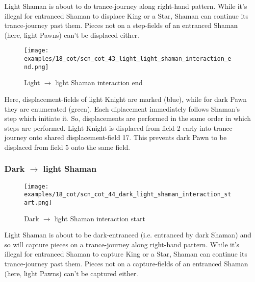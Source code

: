 Light Shaman is about to do trance-journey along right-hand pattern. While it's
illegal for entranced Shaman to displace King or a Star, Shaman can continue its
trance-journey past them. Pieces not on a step-fields of an entranced Shaman (here,
light Pawns) can't be displaced either.

\clearpage %

\noindent
\begin{figure}[!h]
\texttt{[image: examples/18\_cot/scn\_cot\_43\_light\_light\_shaman\_interaction\_end.png]}
\caption{Light $\rightarrow$ light Shaman interaction end}
\label{fig:scn_cot_43_light_light_shaman_interaction_end}
\end{figure}

Here, displacement-fields of light Knight are marked (blue), while for dark Pawn
they are enumerated (green). Each diplacement immediately follows Shaman's step
which initiate it. So, displacements are performed in the same order in which steps
are performed. Light Knight is displaced from field 2 early into trance-journey
onto shared displacement-field 17. This prevents dark Pawn to be displaced from
field 5 onto the same field.

\clearpage %

\subsubsection*{Dark $\rightarrow$ light Shaman}
\label{sec:Conquest of Tlalocan/Trance-journey/Interactions/Dark --> light Shaman}

\vspace*{-1.4\baselineskip}
\noindent
\begin{figure}[!h]
\texttt{[image: examples/18\_cot/scn\_cot\_44\_dark\_light\_shaman\_interaction\_start.png]}
\caption{Dark $\rightarrow$ light Shaman interaction start}
\label{fig:scn_cot_44_dark_light_shaman_interaction_start}
\end{figure}

Light Shaman is about to be dark-entranced (i.e. entranced by dark Shaman) and
so will capture pieces on a trance-journey along right-hand pattern. While it's
illegal for entranced Shaman to capture King or a Star, Shaman can continue its
trance-journey past them. Pieces not on a capture-fields of an entranced Shaman
(here, light Pawns) can't be captured either.

